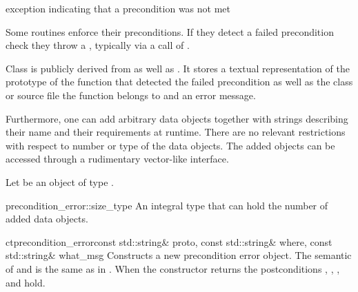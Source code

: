 


\NAME

 \dotfill exception indicating that a precondition
was not met



\ABSTRACT

Some \LiDIA routines enforce their preconditions. If they detect a failed
precondition check they throw a , typically via a
call of . 


\DESCRIPTION

Class  is publicly derived from  as
well as . It stores a textual representation of the
prototype of the function that detected the failed precondition as well as the
class or source file the function belongs to and an error message.

Furthermore, one can add arbitrary data objects together with strings
describing their name and their requirements at runtime. There are no relevant
restrictions with respect to number or type of the data objects. The added
objects can be accessed through a rudimentary vector-like interface.  

Let  be an object of type .


\TYPES

\begin{typedef}{precondition_error::size_type}
  An integral type that can hold the number of added data objects.
\end{typedef}


\CONS

\begin{fcode}{ct}{precondition_error}{const std::string& proto,
                                      const std::string& where,
                                      const std::string& what_msg}
  Constructs a new precondition error object. The semantic of  and
   is the same as in . When the
  constructor returns the postconditions ,
  , ,
  and  hold.
\end{fcode}

